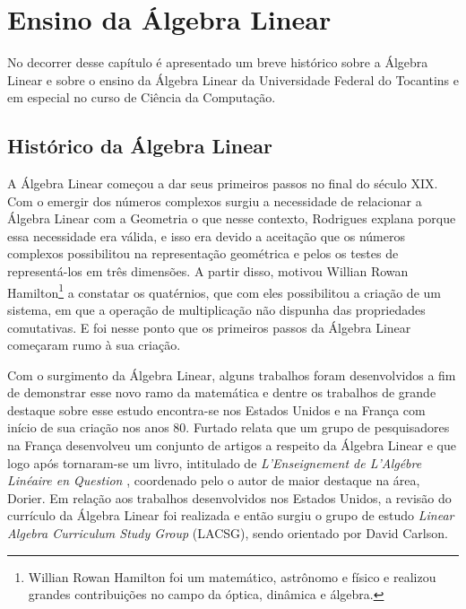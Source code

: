 \chapter{Ensino da Álgebra Linear}
\label{cap:algebra}

\noindent No decorrer desse capítulo é apresentado um breve histórico sobre a Álgebra Linear e sobre o ensino da Álgebra Linear da Universidade Federal do Tocantins e em especial no curso de Ciência da Computação.

\section{Histórico da Álgebra Linear}

\noindent A Álgebra Linear começou a dar seus primeiros passos no final do século XIX. Com o emergir dos números complexos surgiu a necessidade de relacionar a Álgebra Linear com a Geometria o que nesse contexto, Rodrigues \cite{2009:Rodrigues} explana porque essa necessidade era válida, e isso era devido a aceitação que os números complexos possibilitou na representação geométrica e pelos os testes de representá-los em três dimensões. A partir disso, motivou Willian Rowan Hamilton\footnote[1]{Willian Rowan Hamilton foi um matemático, astrônomo e físico e realizou grandes contribuições no campo da óptica, dinâmica e álgebra.} a constatar os quatérnios, que com eles possibilitou a criação de um sistema, em que a operação de multiplicação não dispunha das propriedades comutativas. E foi nesse ponto que os primeiros passos da Álgebra Linear começaram rumo à sua criação.

Com o surgimento da Álgebra Linear, alguns trabalhos foram desenvolvidos a fim de demonstrar esse novo ramo da matemática e dentre os trabalhos de grande destaque sobre esse estudo encontra-se nos Estados Unidos e na França com início de sua criação nos anos 80. Furtado \cite{2011:Furtado} relata que um grupo de pesquisadores na França desenvolveu um conjunto de artigos a respeito da Álgebra Linear e que logo após tornaram-se um livro, intitulado de \textit{L'Enseignement de L'Algébre Linéaire en Question} \cite{1998:dirier}, coordenado pelo o autor de maior destaque na área, Dorier. Em relação aos trabalhos desenvolvidos nos Estados Unidos, a revisão do currículo da Álgebra Linear foi realizada e então surgiu o grupo de estudo \textit{Linear Algebra Curriculum Study Group} (LACSG), sendo orientado por David Carlson. 

